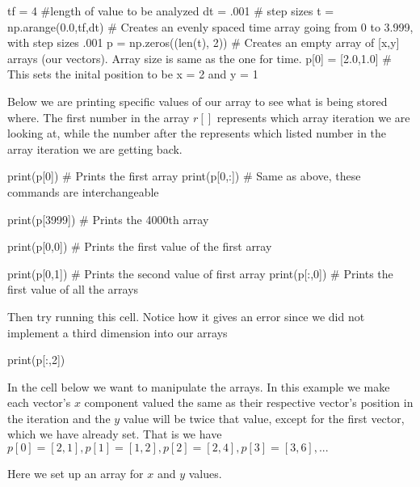 \documentclass[%
oneside,                 %
final,                   %
10pt]{article}
\begin{document}
\bpycod
tf = 4 #length of value to be analyzed
dt = .001 # step sizes
t = np.arange(0.0,tf,dt) # Creates an evenly spaced time array going from 0 to 3.999, with step sizes .001
p = np.zeros((len(t), 2)) # Creates an empty array of [x,y] arrays (our vectors). Array size is same as the one for time.
p[0] = [2.0,1.0] # This sets the inital position to be x = 2 and y = 1

\epycod


Below we are printing specific values of our array to see what is being
stored where. The first number in the array $r[]$ represents which array
iteration we are looking at, while the number after the  represents
which listed number in the array iteration we are getting back. 




\bpycod
print(p[0]) # Prints the first array
print(p[0,:]) # Same as above, these commands are interchangeable 

\epycod



\bpycod
print(p[3999]) # Prints the 4000th array

\epycod




\bpycod
print(p[0,0]) # Prints the first value of the first array

\epycod




\bpycod
print(p[0,1]) # Prints the second value of first array
print(p[:,0]) # Prints the first value of all the arrays

\epycod

Then try running this cell. Notice how it gives an error since we did not implement a third dimension into our arrays


\bpycod
print(p[:,2])

\epycod


In the cell below we want to manipulate the arrays.
In this example we make each vector's $x$ component valued the same as their respective vector's position in the iteration and the $y$ value will be twice that value, except for  the first vector, which we have already set. 
That is we have $p[0] = [2,1], p[1] = [1,2], p[2] = [2,4], p[3] = [3,6], ...$

Here we set up an array for $x$ and $y$ values. 
\end{document}
